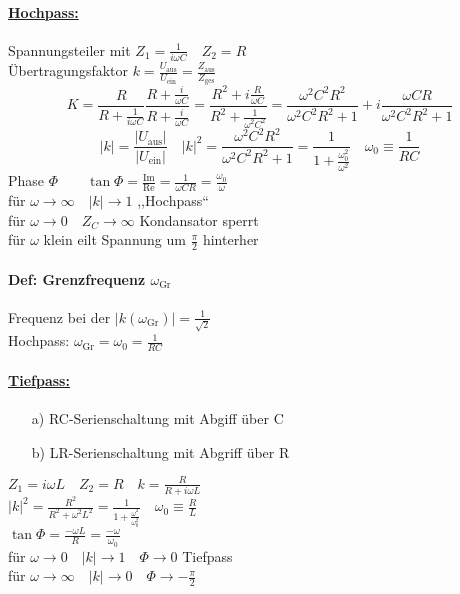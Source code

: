 \documentclass[titlepage,12pt,a4paper,ngerman]{report}
\newcommand{\tx}[1]{\textrm{#1}}
\begin{document}
\paragraph{\underline{Hochpass:}}
Spannungsteiler mit $ Z_1 = \frac{1}{i \omega C} \quad Z_2 = R $\\
Übertragungsfaktor $ k = \frac{U_{\tx{aus}}}{U_{\tx{ein}}} = \frac{Z_{\tx{aus}}}{Z_{\tx{ges}}} $
$$ K = \frac{R}{R + \frac{1}{i \omega C}} \frac{R + \frac{i}{\omega C}}{R + \frac{i}{\omega C}} = \frac{R^2 + i \frac{R}{\omega C}}{ R^2 + \frac{1}{\omega^2 C^2}} = \frac{\omega^2 C^2 R^2}{\omega^2 C^2 R^2 + 1} + i \frac{\omega C R}{\omega^2 C^2 R^2 + 1} $$
$$ |k| = \frac{|U_{\tx{aus}} |}{| U_{\tx{ein}} |} \quad |k|^2 = \frac{\omega ^2 C^2 R^2}{\omega^2 C^2 R^2 + 1} = \frac{1}{1+ \frac{\omega_0^2}{\omega^2}} \quad \omega_0 \equiv \frac{1}{RC} $$
Phase $ \Phi \qquad \tan \Phi = \frac{\tx{Im}}{\tx{Re}} = \frac{1}{\omega C R} = \frac{\omega_0}{\omega} $\\
für $ \omega \rightarrow \infty \quad |k| \rightarrow 1 $ ,,Hochpass``\\
für $ \omega \rightarrow 0 \quad Z_C \rightarrow\infty $ Kondansator sperrt\\
für $ \omega $ klein eilt Spannung um $ \frac{\pi}{2} $ hinterher
\paragraph{Def: Grenzfrequenz $ \omega_{\tx{Gr}} $}
Frequenz bei der $ |k(\omega_{\tx{Gr}})| = \frac{1}{\sqrt{2}} $\\
Hochpass: $ \omega_{\tx{Gr}} = \omega_0 = \frac{1}{RC} $
\paragraph{\underline{Tiefpass:}}
\begin{itemize}
	\item[a)] RC-Serienschaltung mit Abgiff über C
	\item[b)] LR-Serienschaltung mit Abgriff über R
\end{itemize}
$ Z_1 = i \omega L \quad Z_2 = R \quad k = \frac{R}{R+i \omega L} $\\
$ |k|^2 = \frac{R^2}{R^2 + \omega^2 L^2} = \frac{1}{1 + \frac{\omega^2}{\omega_0^2}} \quad \omega_0 \equiv \frac{R}{L} $\\
$ \tan \Phi = \frac{-\omega L}{R} = \frac{-\omega}{\omega_0} $\\
für $ \omega\rightarrow 0 \quad |k| \rightarrow 1 \quad \Phi \rightarrow 0 $ Tiefpass\\
für $ \omega \rightarrow \infty \quad |k| \rightarrow 0 \quad \Phi \rightarrow -\frac{\pi}{2} $\\
\end{document}
